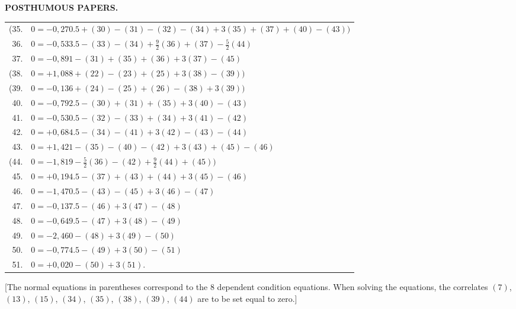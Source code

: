\endgroup
\newpage
{}\hfill\textbf{POSTHUMOUS PAPERS.}
\begingroup
\renewcommand{\arraystretch}{1.16}
\begin{longtable}{@{}r@{\quad}l@{}}
(35.&$0=-0{,}270.5+(30)-(31)-(32)-(34)+3(35)+(37)+(40)-(43))$\\
36.&$0=-0{,}533.5-(33)-(34)+\frac92(36)+(37)-\frac52(44)$\\
37.&$0=-0{,}891-(31)+(35)+(36)+3(37)-(45)$\\
(38.&$0=+1{,}088+(22)-(23)+(25)+3(38)-(39))$\\
(39.&$0=-0{,}136+(24)-(25)+(26)-(38)+3(39))$\\
40.&$0=-0{,}792.5-(30)+(31)+(35)+3(40)-(43)$\\
41.&$0=-0{,}530.5-(32)-(33)+(34)+3(41)-(42)$\\
42.&$0=+0{,}684.5-(34)-(41)+3(42)-(43)-(44)$\\
43.&$0=+1{,}421-(35)-(40)-(42)+3(43)+(45)-(46)$\\
(44.&$0=-1{,}819-\frac52(36)-(42)+\frac92(44)+(45))$\\
45.&$0=+0{,}194.5-(37)+(43)+(44)+3(45)-(46)$\\
46.&$0=-1{,}470.5-(43)-(45)+3(46)-(47)$\\
47.&$0=-0{,}137.5-(46)+3(47)-(48)$\\
48.&$0=-0{,}649.5-(47)+3(48)-(49)$\\
49.&$0=-2{,}460-(48)+3(49)-(50)$\\
50.&$0=-0{,}774.5-(49)+3(50)-(51)$\\
51.&$0=+0{,}020-(50)+3(51).$\\
\end{longtable}
\endgroup

[The normal equations in parentheses correspond to the 8 dependent
condition equations. When solving the equations, the correlates $(7)$, $(13)$, $(15)$,
$(34)$, $(35)$, $(38)$, $(39)$, $(44)$ are to be set equal to zero.]

